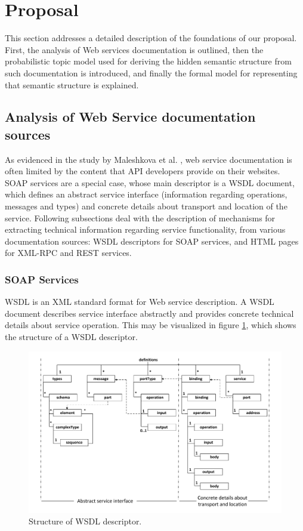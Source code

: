 \section{Proposal}
\label{sec:proposal}

This section addresses a detailed description of the foundations of our proposal. First, the analysis of Web services documentation is outlined, then the probabilistic topic model used for deriving the hidden semantic structure from such documentation is introduced, and finally the formal model for representing that semantic structure is explained.

\subsection{Analysis of Web Service documentation sources}
\label{subsec:analysis-ws-doc}
As evidenced in the study by Maleshkova et al. \cite{Maleshkova:2010}, web service documentation is often limited by the content that API developers provide on their websites. SOAP services are a special case, whose main descriptor is a WSDL document, which defines an abstract service interface (information regarding operations, messages and types) and concrete details about transport and location of the service. Following subsections deal with the description of mechanisms for extracting technical information regarding service functionality, from various documentation sources: WSDL descriptors for SOAP services, and HTML pages for XML-RPC and REST services.

\subsubsection{SOAP Services}
\label{subsub:soap}
WSDL is an XML standard format for Web service description. A WSDL document describes service interface abstractly and provides concrete technical details about service operation. This may be visualized in figure \ref{wsdl-Structure}, which shows the structure of a WSDL descriptor.

\begin{figure}
\includegraphics[scale=0.40]{images/wsdl-structure-en}

\caption{Structure of WSDL descriptor.}
\label{wsdl-Structure}
\end{figure}

